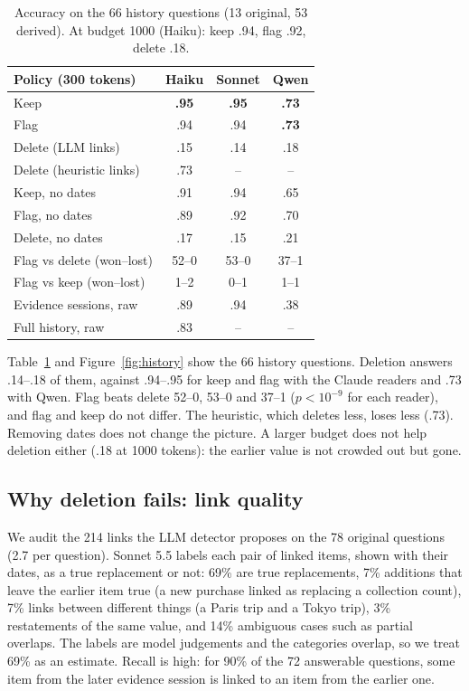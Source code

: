 \documentclass[11pt]{article}
\begin{document}
\begin{table}[t]
\centering
\small
\setlength{\tabcolsep}{4pt}
\begin{tabular}{lccc}
\toprule
Policy (300 tokens) & Haiku & Sonnet & Qwen \\
\midrule
Keep & \textbf{.95} & \textbf{.95} & \textbf{.73} \\
Flag & .94 & .94 & \textbf{.73} \\
Delete (LLM links) & .15 & .14 & .18 \\
Delete (heuristic links) & .73 & -- & -- \\
\midrule
Keep, no dates & .91 & .94 & .65 \\
Flag, no dates & .89 & .92 & .70 \\
Delete, no dates & .17 & .15 & .21 \\
\midrule
Flag vs delete (won--lost) & 52--0 & 53--0 & 37--1 \\
Flag vs keep (won--lost) & 1--2 & 0--1 & 1--1 \\
\midrule
Evidence sessions, raw & .89 & .94 & .38 \\
Full history, raw & .83 & -- & -- \\
\bottomrule
\end{tabular}
\caption{Accuracy on the 66 history questions (13 original, 53 derived). At budget 1000 (Haiku):
keep .94, flag .92, delete .18.}
\label{tab:history}
\end{table}

Table~\ref{tab:history} and Figure~\ref{fig:history} show the 66 history questions. Deletion
answers .14--.18 of them, against .94--.95 for keep and flag with the Claude readers and .73 with Qwen.
Flag beats delete 52--0, 53--0 and 37--1 ($p<10^{-9}$ for each reader), and flag and keep do not differ.
The heuristic, which deletes less, loses less
(.73). Removing dates does not change the picture. A larger budget does not help deletion either
(.18 at 1000 tokens): the earlier value is not crowded out but gone.

\subsection{Why deletion fails: link quality}
\label{sec:links}

We audit the 214 links the LLM detector proposes on the 78 original questions (2.7 per question).
Sonnet 5.5 labels each pair of linked items, shown with their dates, as a true replacement or not:
69\% are true replacements, 7\% additions that leave the earlier item true (a new purchase linked as
replacing a collection count), 7\% links between different things (a Paris trip and a Tokyo trip),
3\% restatements of the same value, and 14\% ambiguous cases such as partial overlaps. The labels are
model judgements and the categories overlap, so we treat 69\% as an estimate. Recall is high: for
90\% of the 72 answerable questions, some item from the later evidence session is linked to an item
from the earlier one.
\end{document}
